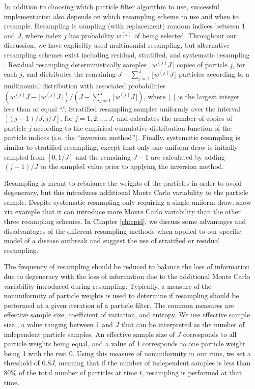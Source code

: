 In addition to choosing which particle filter algorithm to use, successful implementation also depends on which resampling scheme to use and when to resample. Resampling is sampling (with replacement) random indices between 1 and $J$, where index $j$ has probability $w^{(j)}$ of being selected. Throughout our discussion, we have explicitly used multinomial resampling, but alternative resampling schemes exist including residual, stratified, and systematic resampling \citep{Douc:Capp:Moul:comp:2005}. Residual resampling deterministically samples $\lfloor w^{(j)} J \rfloor$ copies of particle $j$, for each $j$, and distributes the remaining $J - \sum^J_{j=1} \lfloor w^{(j)} J \rfloor$  particles according to a multinomial distribution with associated probabilities $(w^{(j)} J - \lfloor w^{(j)} J \rfloor) / (J - \sum^J_{j=1} \lfloor w^{(j)} J \rfloor)$, where $\lfloor . \rfloor$ is the largest integer less than or equal ``.''. Stratified resampling samples uniformly over the interval $[(j-1) / J, j / J]$, for $j = 1, 2, \ldots, J$, and calculates the number of copies of particle $j$ according to the empirical cumulative distribution function of the particle indices (i.e. the ``inversion method''). Finally, systematic resampling is similar to stratified resampling, except that only one uniform draw is initially sampled from $[0, 1/J]$ and the remaining $J-1$ are calculated by adding $(j-1) / J$ to the sampled value prior to applying the inversion method.

Resampling is meant to rebalance the weights of the particles in order to avoid degeneracy, but this introduces additional Monte Carlo variability to the particle sample. Despite systematic resampling only requiring a single uniform draw, \citet{Douc:Capp:Moul:comp:2005} show via example that it can introduce more Monte Carlo variability than the other three resampling schemes. In Chapter \ref{ch:epid}, we discuss some advantages and disadvantages of the different resampling methods when applied to our specific model of a disease outbreak and suggest the use of stratified or residual resampling.

The frequency of resampling should be reduced to balance the loss of information due to degeneracy with the loss of information due to the additional Monte Carlo variability introduced during resampling. Typically, a measure of the nonuniformity of particle weights is used to determine if resampling should be performed at a given iteration of a particle filter. The common measures are effective sample size, coefficient of variation, and entropy. We use effective sample size \citep{Liu:Chen:Wong:reje:1998}, a value ranging between 1 and $J$ that can be interpreted as the number of independent particle samples. An effective sample size of $J$ corresponds to all particle weights being equal, and a value of 1 corresponds to one particle weight being 1 with the rest 0. Using this measure of nonuniformity in our runs, we set a threshold of $0.8J$, meaning that if the number of independent samples is less than 80\% of the total number of particles at time $t$, resampling is performed at that time.

